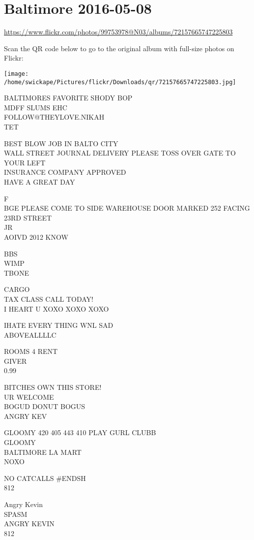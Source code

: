 \documentclass[10pt,letterpaper]{article}
\begin{document}
\section*{Baltimore 2016-05-08}

\url{https://www.flickr.com/photos/99753978@N03/albums/72157665747225803}

Scan the QR code below to go to the original album with full-size photos on Flickr:

\texttt{[image: /home/swickape/Pictures/flickr/Downloads/qr/72157665747225803.jpg]}


BALTIMORES FAVORITE SHODY BOP\\
MDFF SLUMS EHC\\
FOLLOW@THEYLOVE.NIKAH\\
TET

BEST BLOW JOB IN BALTO CITY\\
WALL STREET JOURNAL DELIVERY PLEASE TOSS OVER GATE TO YOUR LEFT\\
INSURANCE COMPANY APPROVED\\
HAVE A GREAT DAY

F\\
BGE PLEASE COME TO SIDE WAREHOUSE DOOR MARKED 252 FACING 23RD STREET\\
JR\\
AOIVD 2012 KNOW

BBS\\
WIMP\\
TBONE

CARGO\\
TAX CLASS CALL TODAY!\\
I HEART U XOXO XOXO XOXO

IHATE EVERY THING WNL SAD\\
ABOVEALLLLC

ROOMS 4 RENT\\
GIVER\\
0.99

BITCHES OWN THIS STORE!\\
UR WELCOME\\
BOGUD DONUT BOGUS\\
ANGRY KEV

GLOOMY 420 405 443 410 PLAY GURL CLUBB\\
GLOOMY\\
BALTIMORE LA MART\\
NOXO

NO CATCALLS \#ENDSH\\
812

Angry Kevin\\
SPASM\\
ANGRY KEVIN\\
812
\end{document}
